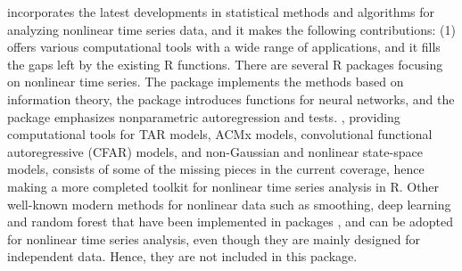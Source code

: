  incorporates
the latest developments in statistical methods and algorithms for analyzing nonlinear time series data, and it makes the following contributions: (1)  offers various computational tools with a wide range of applications, and it fills the gaps left by the existing R functions. There are several R packages focusing on nonlinear time series. The  package implements the methods based on information theory, the  package introduces functions for neural networks, and the  package emphasizes nonparametric autoregression and tests. , providing computational tools for TAR models, ACMx models, convolutional functional autoregressive (CFAR) models, and non-Gaussian and nonlinear state-space models, consists of some of the missing pieces in the current coverage, hence making a more completed toolkit for nonlinear time series analysis in R. Other well-known modern methods for nonlinear data such as smoothing, deep learning and random forest that have been implemented in packages ,  and  can be adopted for nonlinear time series analysis, even though they are mainly designed for independent data. Hence, they are not included in this package.
